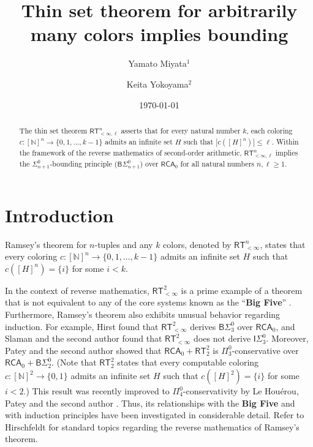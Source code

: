 \documentclass[10pt,reqno]{amsart}
\numberwithin{equation}{section}
\begin{document}
\title{Thin set theorem for arbitrarily many colors implies bounding}


\author{Yamato Miyata$^{1}$}
\address{$^{1}$Mathematical Institute, Tohoku University}


\author{Keita Yokoyama$^{2}$}
\address{$^{2}$Mathematical Institute, Tohoku University}


\date{\today}


\begin{abstract}
The thin set theorem $\mathsf{RT}_{<\infty,\ell}^{n}$ asserts that for every natural number $k$, each coloring $c\colon[\mathbb{N}]^n \to \{0,1,\dots,k-1\}$ admits an infinite set $H$ such that $|c([H]^n)| \le \ell$. Within the framework of the reverse mathematics of second-order arithmetic, $\mathsf{RT}_{<\infty,\ell}^{n}$ implies the $\Sigma_{n+1}^{0}$-bounding principle ($\mathsf{B}\Sigma_{n+1}^{0}$) over $\mathsf{RCA}_0$ for all natural numbers $n, \ell \ge 1$.
\end{abstract}
\maketitle
\tableofcontents


\section{Introduction}
Ramsey's theorem for $n$-tuples and any $k$ colors, denoted by $\mathsf{RT}_{<\infty}^{n}$, states that every coloring $c\colon[\mathbb{N}]^n \to \{0,1,\dots,k-1\}$ admits an infinite set $H$ such that $c([H]^n) = \{i\}$ for some $i < k$.


In the context of reverse mathematics, $\mathsf{RT}_{<\infty}^{2}$ is a prime example of a theorem that is not equivalent to any of the core systems known as the ``\textbf{Big Five}'' \cite{Hirst,Liu}. Furthermore, Ramsey's theorem also exhibits unusual behavior regarding induction. For example, Hirst \cite[Theorem 6.11]{Hirst} found that $\mathsf{RT}_{<\infty}^{2}$ derives $\mathsf{B}\Sigma_{3}^{0}$ over $\mathsf{RCA}_0$, and Slaman and the second author \cite{Slaman-Yokoyama} found that $\mathsf{RT}_{<\infty}^{2}$ does not derive $\mathsf{I}\Sigma_{3}^{0}$.
Moreover, Patey and the second author \cite{Patey-Yokoyama} showed that $\mathsf{RCA}_0+\mathsf{RT}_{2}^{2}$ is $\Pi_{3}^{0}$-conservative over $\mathsf{RCA}_0+\mathsf{B}\Sigma_{2}^{0}$. (Note that $\mathsf{RT}_{2}^{2}$ states that every computable coloring $c\colon[\mathbb{N}]^2\to\{0,1\}$ admits an infinite set $H$ such that $c([H]^2)=\{i\}$ for some $i<2$.) This result was recently improved to $\Pi_{4}^{0}$-conservativity by Le Hou\'erou, Patey and the second author \cite{Houerou-Patey-Yokoyama}.
Thus, its relationships with the \textbf{Big Five} and with induction principles have been investigated in considerable detail. Refer to Hirschfeldt \cite{Hirschfeldt} for standard topics regarding the reverse mathematics of Ramsey's theorem.
\end{document}
